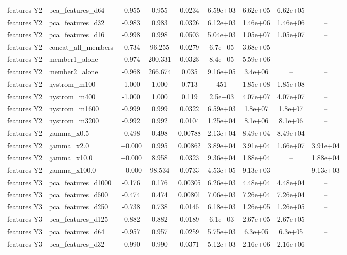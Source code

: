 \begin{tabular}{llccccccc}
features Y2 & pca\_features\_d64 & -0.955 & 0.955 & 0.0234 & 6.59e+03 & 6.62e+05 & 6.62e+05 & -- \\
features Y2 & pca\_features\_d32 & -0.983 & 0.983 & 0.0326 & 6.12e+03 & 1.46e+06 & 1.46e+06 & -- \\
features Y2 & pca\_features\_d16 & -0.998 & 0.998 & 0.0503 & 5.04e+03 & 1.05e+07 & 1.05e+07 & -- \\
features Y2 & concat\_all\_members & -0.734 & 96.255 & 0.0279 & 6.7e+05 & 3.68e+05 & -- & -- \\
features Y2 & member1\_alone & -0.974 & 200.331 & 0.0328 & 8.4e+05 & 5.59e+06 & -- & -- \\
features Y2 & member2\_alone & -0.968 & 266.674 & 0.035 & 9.16e+05 & 3.4e+06 & -- & -- \\
features Y2 & nystrom\_m100 & -1.000 & 1.000 & 0.713 & 451 & 1.85e+08 & 1.85e+08 & -- \\
features Y2 & nystrom\_m400 & -1.000 & 1.000 & 0.119 & 2.5e+03 & 4.07e+07 & 4.07e+07 & -- \\
features Y2 & nystrom\_m1600 & -0.999 & 0.999 & 0.0322 & 6.59e+03 & 1.8e+07 & 1.8e+07 & -- \\
features Y2 & nystrom\_m3200 & -0.992 & 0.992 & 0.0104 & 1.25e+04 & 8.1e+06 & 8.1e+06 & -- \\
features Y2 & gamma\_x0.5 & -0.498 & 0.498 & 0.00788 & 2.13e+04 & 8.49e+04 & 8.49e+04 & -- \\
features Y2 & gamma\_x2.0 & +0.000 & 0.995 & 0.00862 & 3.89e+04 & 3.91e+04 & 1.66e+07 & 3.91e+04 \\
features Y2 & gamma\_x10.0 & +0.000 & 8.958 & 0.0323 & 9.36e+04 & 1.88e+04 & -- & 1.88e+04 \\
features Y2 & gamma\_x100.0 & +0.000 & 98.534 & 0.0733 & 4.53e+05 & 9.13e+03 & -- & 9.13e+03 \\
features Y3 & pca\_features\_d1000 & -0.176 & 0.176 & 0.00305 & 6.26e+03 & 4.48e+04 & 4.48e+04 & -- \\
features Y3 & pca\_features\_d500 & -0.474 & 0.474 & 0.00801 & 7.06e+03 & 7.26e+04 & 7.26e+04 & -- \\
features Y3 & pca\_features\_d250 & -0.738 & 0.738 & 0.0145 & 6.18e+03 & 1.26e+05 & 1.26e+05 & -- \\
features Y3 & pca\_features\_d125 & -0.882 & 0.882 & 0.0189 & 6.1e+03 & 2.67e+05 & 2.67e+05 & -- \\
features Y3 & pca\_features\_d64 & -0.957 & 0.957 & 0.0259 & 5.75e+03 & 6.3e+05 & 6.3e+05 & -- \\
features Y3 & pca\_features\_d32 & -0.990 & 0.990 & 0.0371 & 5.12e+03 & 2.16e+06 & 2.16e+06 & -- \\

\end{tabular}
